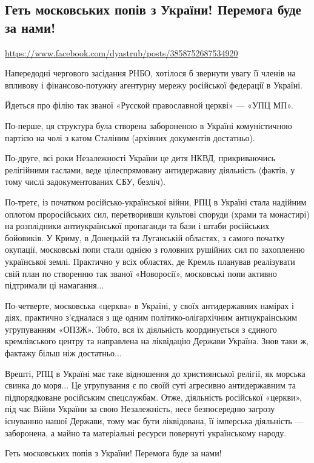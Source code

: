  
 
 
 
 
\subsection{Геть московських попів з України! Перемога буде за нами!}
\url{https://www.facebook.com/dyastrub/posts/3858752687534920}

Напередодні чергового засідання РНБО, хотілося б звернути увагу її членів на
впливову  і фінансово-потужну агентурну мережу російської федерації в Україні.

Йдеться про філію так званої «Русской православной церкві» — «УПЦ МП».

По-перше, ця структура була створена забороненою в Україні комуністичною
партією на чолі з катом Сталіним (архівних документів достатньо).

По-друге, всі роки Незалежності України це дитя НКВД, прикриваючись релігійними
гаслами, веде цілеспрямовану антидержавну діяльність (фактів, у тому числі
задокументованих СБУ, безліч).

По-третє, із початком російсько-української війни, РПЦ в Україні стала надійним
оплотом проросійських сил, перетворивши культові споруди (храми та монастирі)
на розплідники антиукраїнської пропаганди та бази і штаби російських бойовиків.
У Криму, в Донецькій та Луганській областях, з самого початку окупації,
московські попи стали однією з головних рушійних сил по захопленню української
землі. Практично у всіх областях, де Кремль планував реалізувати свій план по
створенню так званої «Новоросії», московські попи активно підтримали ці
намагання...

По-четверте, московська «церква» в Україні, у своїх антидержавних намірах і
діях, практично з’єдналася з ще одним політико-олігархічним антиукраінським
угрупуванням «ОПЗЖ». Тобто, вся їх діяльність координується з єдиного
кремлівського центру та направлена на ліквідацію Держави Україна. Знов таки ж,
фактажу більш ніж достатньо...

Врешті, РПЦ в Україні має таке відношення до християнської релігії, як морська
свинка до моря... Це угрупування є по своїй суті агресивно антидержавним та
підпорядковане російським спецслужбам. Отже, діяльність російської «церкви»,
під час Війни України за свою Незалежність, несе безпосередню загрозу існуванню
нашої Держави, тому має бути ліквідована, її імперська діяльність — заборонена,
а майно та матеріальні ресурси повернуті українському народу.

Геть московських попів з України! Перемога буде за нами!
